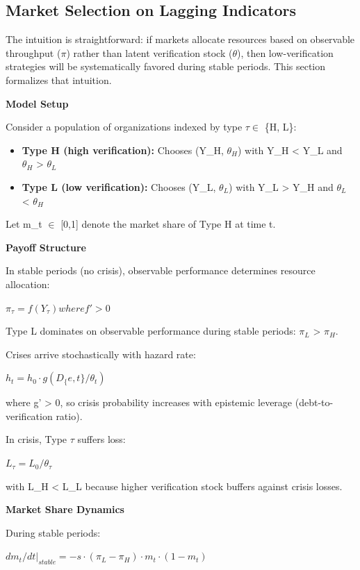 \documentclass[11pt,a4paper]{article}
\providecommand{\tightlist}{\setlength{\itemsep}{0pt}\setlength{\parskip}{0pt}}
\begin{document}
\hypertarget{market-selection-on-lagging-indicators}{%
\subsection{ Market Selection on Lagging Indicators}\label{market-selection-on-lagging-indicators}}

The intuition is straightforward: if markets allocate resources based on observable throughput ($\pi$) rather than latent verification stock ($\theta$), then low-verification strategies will be systematically favored during stable periods. This section formalizes that intuition.

\textbf{Model Setup}

Consider a population of organizations indexed by type $\tau \in$ \{H, L\}:

\begin{itemize}
\tightlist
\item
  \textbf{Type H (high verification):} Chooses (Y\_H, $\theta_{H}$) with Y\_H < Y\_L and $\theta_{H}$ > $\theta_{L}$
\item
  \textbf{Type L (low verification):} Chooses (Y\_L, $\theta_{L}$) with Y\_L > Y\_H and $\theta_{L}$ < $\theta_{H}$
\end{itemize}

Let m\_t $\in$ {[}0,1{]} denote the market share of Type H at time t.

\textbf{Payoff Structure}

In stable periods (no crisis), observable performance determines resource allocation:

$\pi_\tau = f(Y_\tau) where f' > 0$

Type L dominates on observable performance during stable periods: $\pi_{L}$ > $\pi_{H}$.

Crises arrive stochastically with hazard rate:

$h_t = h_0 \cdot g(D_\{e,t\} / \theta_t)$

where g' > 0, so crisis probability increases with epistemic leverage (debt-to-verification ratio).

In crisis, Type $\tau$ suffers loss:

$L_\tau = L_0 / \theta_\tau$

with L\_H < L\_L because higher verification stock buffers against crisis losses.

\textbf{Market Share Dynamics}

During stable periods:

$dm_t/dt |_{stable} = -s \cdot (\pi_L - \pi_H) \cdot m_t \cdot (1 - m_t)$
\end{document}
